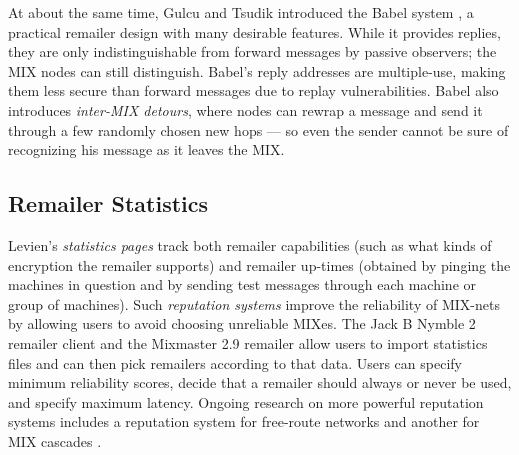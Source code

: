 \documentclass{llncs}
\begin{document}
At about the same time, Gulcu and Tsudik introduced the Babel
system \cite{babel}, a practical remailer design with many desirable
features. While it provides replies, they are only indistinguishable
from forward messages by passive observers; the MIX nodes can still
distinguish. Babel's reply addresses are multiple-use, making them less
secure than forward messages due to replay vulnerabilities. Babel also
introduces \emph{inter-MIX detours}, where nodes can rewrap a message
and send it through a few randomly chosen new hops --- so even the sender
cannot be sure of recognizing his message as it leaves the MIX.

%
%

\subsection{Remailer Statistics}

Levien's \emph{statistics pages} \cite{levien} track both remailer
capabilities (such as what kinds of encryption the remailer supports)
and remailer up-times (obtained by pinging the machines in question
and by sending test messages through each machine or group of
machines).  Such \emph{reputation systems} improve the reliability of
MIX-nets by allowing users to avoid choosing unreliable MIXes. The
Jack B Nymble 2 remailer client \cite{potato} and the Mixmaster 2.9
remailer allow users to import statistics files and can then pick
remailers according to that data. Users can specify minimum
reliability scores, decide that a remailer should always or never be
used, and specify maximum latency. Ongoing research on more powerful
reputation systems includes a reputation system for free-route
networks \cite{mix-acc} and another for MIX cascades \cite{casc-rep}.
\end{document}
